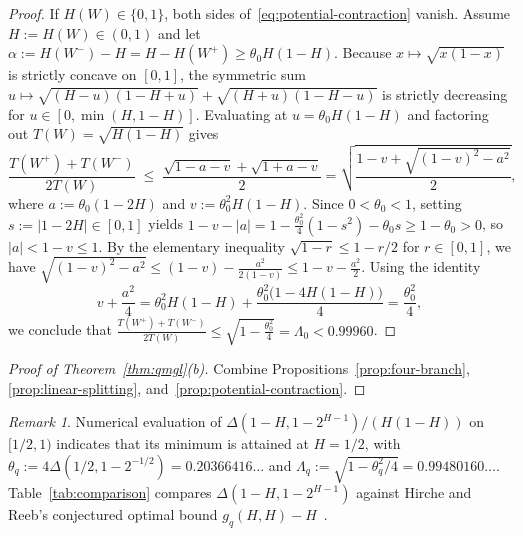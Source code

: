 \documentclass[10pt,a4paper]{article}
\numberwithin{equation}{section}
\theoremstyle{plain}
\theoremstyle{definition}
\theoremstyle{remark}
\newtheorem*{remark}{Remark}
\begin{document}
\begin{proof}
If $H(W) \in \{0,1\}$, both sides of~\eqref{eq:potential-contraction} vanish. Assume $H := H(W) \in (0,1)$ and let $\alpha := H(W^-) - H = H - H(W^+) \ge \theta_0 H(1 - H)$. Because $x \mapsto \sqrt{x(1 - x)}$ is strictly concave on $[0,1]$, the symmetric sum $u \mapsto \sqrt{(H - u)(1 - H + u)} + \sqrt{(H + u)(1 - H - u)}$ is strictly decreasing for $u \in [0, \min(H, 1 - H)]$. Evaluating at $u = \theta_0 H(1 - H)$ and factoring out $T(W) = \sqrt{H(1 - H)}$ gives
\[
\frac{T(W^+) + T(W^-)}{2 T(W)} \;\le\; \frac{\sqrt{1 - a - v} + \sqrt{1 + a - v}}{2} = \sqrt{\frac{1 - v + \sqrt{(1 - v)^2 - a^2}}{2}},
\]
where $a := \theta_0(1 - 2H)$ and $v := \theta_0^2 H(1 - H)$. Since $0 < \theta_0 < 1$, setting $s := \lvert 1 - 2H \rvert \in [0,1]$ yields $1 - v - \lvert a \rvert = 1 - \frac{\theta_0^2}{4}(1 - s^2) - \theta_0 s \ge 1 - \theta_0 > 0$, so $\lvert a \rvert < 1 - v \le 1$. By the elementary inequality $\sqrt{1 - r} \le 1 - r/2$ for $r \in [0,1]$, we have $\sqrt{(1 - v)^2 - a^2} \le (1 - v) - \frac{a^2}{2(1 - v)} \le 1 - v - \frac{a^2}{2}$. Using the identity
\[
v + \frac{a^2}{4} = \theta_0^2 H(1 - H) + \frac{\theta_0^2\bigl(1 - 4H(1 - H)\bigr)}{4} = \frac{\theta_0^2}{4},
\]
we conclude that $\frac{T(W^+) + T(W^-)}{2 T(W)} \le \sqrt{1 - \frac{\theta_0^2}{4}} = \Lambda_0 < 0.99960$.
\end{proof}

\begin{proof}[Proof of Theorem~\ref{thm:qmgl}(b)]
Combine Propositions~\ref{prop:four-branch}, \ref{prop:linear-splitting}, and~\ref{prop:potential-contraction}.
\end{proof}

\begin{remark}
Numerical evaluation of $\Delta(1 - H, 1 - 2^{H-1})/(H(1 - H))$ on $[1/2, 1)$ indicates that its minimum is attained at $H = 1/2$, with $\theta_q := 4\Delta(1/2, 1 - 2^{-1/2}) = 0.20366416\ldots$ and $\Lambda_q := \sqrt{1 - \theta_q^2/4} = 0.99480160\ldots$. Table~\ref{tab:comparison} compares $\Delta(1 - H, 1 - 2^{H-1})$ against Hirche and Reeb's conjectured optimal bound $g_q(H,H) - H$~\cite[Conjecture~VII.1]{HircheReeb2018}.
\end{remark}
\end{document}
